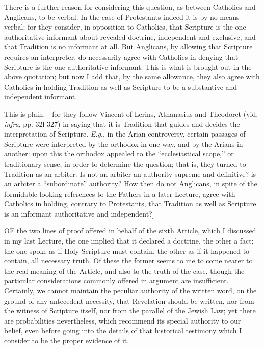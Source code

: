 There is a further reason for considering this question, as between
Catholics and Anglicans, to be verbal. In the case of Protestants
indeed it is by no means verbal; for they consider, in opposition to
Catholics, that Scripture is the one authoritative informant about
revealed doctrine, independent and exclusive, and that Tradition is no
informant at all. But Anglicans, by allowing that Scripture requires
an interpreter, do necessarily agree with Catholics in denying
that Scripture is the one authoritative informant. This is what is
brought out in the above quotation; but now I add that, by the same
allowance, they also agree with Catholics in holding Tradition as well
as Scripture to be a substantive and independent informant.

This is plain:—for they follow Vincent of Lerins, Athanasius and
Theodoret (vid. \emph{infra}, pp. 32l-327) in saying that it is
Tradition that guides and decides the interpretation of Scripture. \emph{E.g}.,
in the Arian controversy, certain passages of Scripture were
interpreted by the orthodox in one way, and by the Arians in another:
upon this the orthodox appealed to the ``ecclesiastical
scope,'' or traditionary sense, in order to determine the
question; that is, they turned to Tradition as an arbiter. Is not an
arbiter an authority supreme and definitive? is an arbiter a
``subordinate'' authority? How then do not Anglicans, in spite
of the formidable-looking references to the Fathers in a later
Lecture, agree with Catholics in holding, contrary to Protestants,
that Tradition as well as Scripture is an informant authoritative and
independent?]


OF the two lines of proof offered in
behalf of the sixth Article, which I discussed in my last Lecture, the
one implied that it declared a doctrine, the other a fact; the one
spoke as if Holy Scripture must contain, the other as if it happened
to contain, all necessary truth. Of these the former seems to me to
come nearer to the real meaning of the Article, and also to the truth
of the case, though the particular considerations commonly offered in
argument are insufficient. Certainly, we cannot maintain the peculiar
authority of the written word, on the ground of any antecedent
necessity, that Revelation should be written, nor from the witness of
Scripture itself, nor from the parallel of the Jewish Law; yet there
are probabilities nevertheless, which recommend its special authority
to our belief, even before going into the details of that historical
testimony which I consider to be the proper evidence of it.

